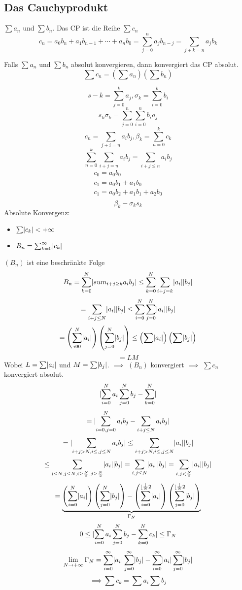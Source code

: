 \subsection{Das Cauchyprodukt}
\begin{Def}
  $\sum a_n$ und $\sum b_n$. Das CP ist die Reihe $\sum c_n$
  \[c_n=a_0b_n+a_1b_{n-1}+\cdots+a_nb_0=\sum^n_{j=0}a_jb_{n-j}=\sum_{j+k=n}a_jb_k\]
\end{Def}
\begin{Sat}
  Falls $\sum a_n$ und $\sum b_n$ absolut konvergieren, dann konvergiert das CP absolut.
  \[\sum c_n=\left( \sum a_n \right)\left( \sum b_n \right)\]
\end{Sat}
\begin{Bew}
  \[s-k=\sum^k_{j=0}a_j, \sigma_k=\sum_{i=0}^k b_i\]
  \[s_k\sigma_k=\sum^n_{j=0}\sum^n_{i=0}b_ia_j\]
  \[c_n=\sum_{j+i=n}a_ib_j, \beta_k=\sum^k_{n=0}c_k\]
  \[\sum^k_{n=0}\sum_{i+j=n}a_ib_j=\sum_{i+j\leq n}a_ib_j\]
  \begin{align*}
    c_0=a_0b_0\\
    c_1=a_0b_1+a_1b_0\\
    c_1=a_0b_2+a_1b_1+a_2b_0\\
  \end{align*}
  \[\beta_k-\sigma_ks_k\]
  Absolute Konvergenz:
  \begin{itemize}
    \item $\sum\mathopen| c_k \mathclose|<+\infty$
    \item $B_n=\sum^\infty_{k=0}\mathopen| c_k \mathclose|$
  \end{itemize}
  $\left( B_n \right)$ ist eine beschränkte Folge
  \[B_n=\sum^N_{k=0}\mathopen| sum_{i+j\geq k}a_ib_j \mathclose|\leq\sum^N_{k=0}\sum_{i+j=k}\mathopen| a_i \mathclose|\mathopen| b_j \mathclose|\]
  \[=\sum_{i+j\leq N}\mathopen| a_i \mathclose|\mathopen| b_j \mathclose|\leq\sum^N_{i=0}\sum^N_{j=0}\mathopen| a_i \mathclose|\mathopen| b_j \mathclose|\]
  \[=\left( \sum^N_{i00}\mathopen| a_i \mathclose| \right)\left( \sum_{j=0}^N\mathopen| b_j \mathclose| \right)\leq\left( \sum\mathopen| a_i \mathclose| \right)\left( \sum\mathopen| b_j \mathclose| \right)\]
  \[=LM\]
  Wobei $L=\sum\mathopen| a_i \mathclose|$ und $M=\sum\mathopen| b_j \mathclose|$. $\implies$ $\left( B_n \right)$ konvergiert $\implies$ $\sum c_n$ konvergiert absolut.
  \[\mathopen|  \sum^N_{i=0}a_i \sum^N_{j=0}b_j-\sum^N_{k=0} \mathclose|\]
  \[=\mathopen| \sum^N_{i=0, j=0}a_ib_j-\sum_{i+j\leq N}a_ib_j \mathclose|\]
  \[=\mathopen| \sum_{i+j>N, i\leq , j\leq N}a_ib_j \mathclose|\leq\sum_{i+j>N, i\leq , j\leq N}\mathopen| a_i \mathclose|\mathopen| b_j \mathclose|\]
  \[\leq \sum_{i\leq N, j\leq N, i\geq \frac{N}{2}, j\geq\frac{N}{2}}\mathopen| a_i \mathclose|\mathopen| b_j \mathclose|=\sum_{i,j\leq N}\mathopen| a_i \mathclose|\mathopen| b_j \mathclose|=\sum_{i,j<\frac{N}{2}}\mathopen| a_i \mathclose|\mathopen| b_j \mathclose|\]
  \[=\underbrace{\left( \sum^N_{i=0}\mathopen| a_i \mathclose| \right)\left( \sum^N_{j=0}\mathopen| b_j \mathclose| \right)-\left( \sum_{i=0}^{\lfloor \frac \rfloor{N}{2}}\mathopen| a_i \mathclose| \right)\left( \sum^{\lfloor \frac \rfloor{N}{2}}_{j=0}\mathopen| b_j \mathclose| \right)}_{\Gamma_N}\]
  \[0\leq\mathopen| \sum_{i=0}^Na_i\sum^N_{j=0}b_j-\sum^N_{k=0}c_k \mathclose|\leq \Gamma_N\]
  \[\lim_{N\to+\infty}\Gamma_N=\sum^\infty_{i=0}\mathopen| a_i \mathclose|\sum^\infty_{j=0}\mathopen| b_j \mathclose|-\sum^\infty_{i=0}\mathopen| a_i \mathclose|\sum^\infty_{j=0}\mathopen| b_j \mathclose|\]
  \[\implies \sum c_k=\sum a_i\sum b_j\]
\end{Bew}
